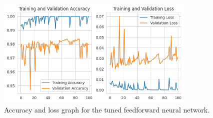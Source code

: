 \begin{figure}[ht]
    \centering
    \includegraphics[width=0.85\textwidth]{./img/ffnn/tuned/accuracy-loss-graph}
    \caption{Accuracy and loss graph for the tuned feedforward neural network.}
    \label{fig:ffnn-tuned-accuracy-loss-graph}
\end{figure}

